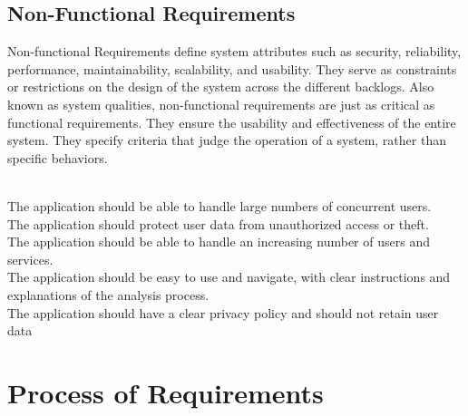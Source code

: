 \subsection{Non-Functional Requirements}
Non-functional Requirements define system attributes such as security,
reliability, performance, maintainability, scalability, and usability. They serve as
constraints or restrictions on the design of the system across the different backlogs.
Also known as system qualities, non-functional requirements are just as critical as
functional requirements. They ensure the usability and effectiveness of the entire
system. They specify criteria that judge the operation of a system, rather than specific
behaviors.

\begin{itemize}
     \vspace{0.2cm} \\
        The application should be able to handle large numbers of concurrent users.  
     \vspace{0.2cm} \\
        The application should protect user data from
        unauthorized access or theft.
     \vspace{0.2cm} \\
        The application should be able to handle an increasing number of users and services.
     \vspace{0.2cm} \\
        The application should be easy to use and navigate, with
        clear instructions and explanations of the analysis process.
     \vspace{0.2cm} \\
        The application should have a clear privacy policy and
        should not retain user data
    
\end{itemize}

\section{Process of Requirements }
